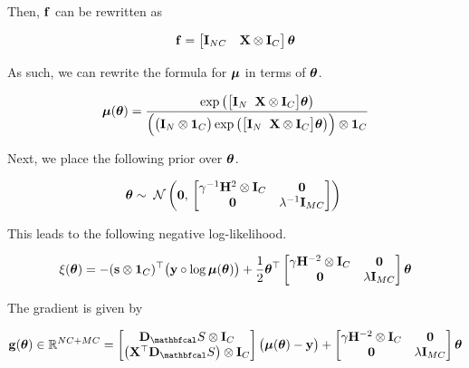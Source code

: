 Then, $\mathbf{f}$ can be rewritten as 

\begin{equation}
    \mathbf{f} = \begin{bmatrix}
        \mathbf{I}_{NC} & \mathbf{X} \otimes \mathbf{I}_C 
    \end{bmatrix} \boldsymbol{\theta}
\end{equation}

As such, we can rewrite the formula for $\boldsymbol{\mu}$ in terms of $\boldsymbol{\theta}$. 

\begin{equation}
 \boldsymbol{\mu}(\boldsymbol{\theta}) = \frac{\exp\left(\big[\mathbf{I}_N \;\; \mathbf{X} \otimes \mathbf{I}_C \big] \boldsymbol{\theta}\right)}{ \Big( \big(\mathbf{I}_N \otimes \mathbf{1}_C\big) \exp\big(\big[\mathbf{I}_N \;\; \mathbf{X} \otimes \mathbf{I}_C\big] \boldsymbol{\theta}\big)\Big) \otimes \mathbf{1}_C}
\end{equation}

Next, we place the following prior over $\boldsymbol{\theta}$. 

\begin{equation}
    \boldsymbol{\theta} \sim \; \mathcal{N}\left(\mathbf{0}, \, \begin{bmatrix}\gamma^{-1} \mathbf{H}^2 \otimes \mathbf{I}_C & \mathbf{0} \\
    \mathbf{0} & \lambda^{-1} \mathbf{I}_{MC} \end{bmatrix}\right) \;
\end{equation}


This leads to the following negative log-likelihood. 

\begin{equation}
    \xi(\boldsymbol{\theta}) = - (\mathbf{s} \otimes \mathbf{1}_C)^\top \big(\mathbf{y} \circ \log \boldsymbol{\mu}(\boldsymbol{\theta}) \big) + \frac{1}{2} \boldsymbol{\theta}^\top \begin{bmatrix}\gamma \mathbf{H}^{-2} \otimes \mathbf{I}_C & \mathbf{0} \\
        \mathbf{0} & \lambda \mathbf{I}_{MC} \end{bmatrix} \boldsymbol{\theta}
\end{equation}

The gradient is given by 

\begin{equation}
    \g(\thetaa) \in \R^{NC + MC} = \begin{bmatrix}
        \D_\St \otimes \I_C \\ \left(\X^\top \D_\St\right) \otimes \I_C
    \end{bmatrix} \big(\muu(\thetaa) - \y\big) + \begin{bmatrix}
        \gamma \HH^{-2} \otimes \I_C & \zero \\
    \zero & \lambda \I_{MC}
    \end{bmatrix} \thetaa
\end{equation}

